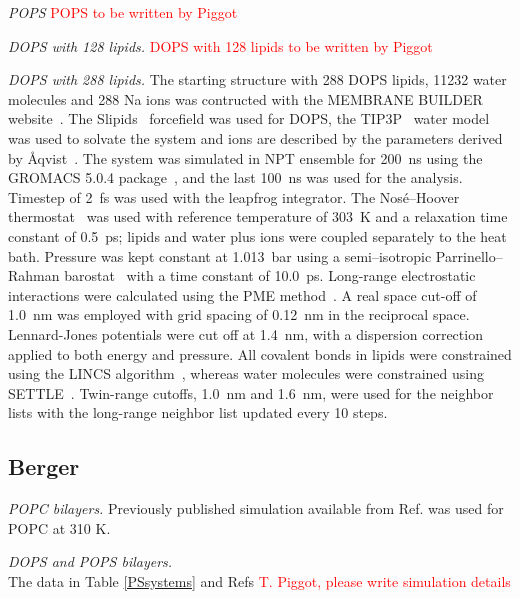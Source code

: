 \documentclass[journal=jpcbfk]{achemso}
\newcommand{\todo}[1]{\textcolor{red}{#1}}
\begin{document}
\noindent
{\it POPS}
\todo{POPS \cite{slipidsPOPS298K} to be written by Piggot}

\noindent
{\it DOPS with 128 lipids.}
\todo{DOPS with 128 lipids \cite{slipidsDOPS303K} to be written by Piggot}

\noindent
{\it DOPS with 288 lipids.}
The starting structure with 288 DOPS lipids, 11232 water molecules and 288 Na ions
was contructed with the MEMBRANE BUILDER website~\cite{ghahremanpour13}.
The Slipids~\cite{jambeck12,jambeck2012another} forcefield was used for DOPS, the TIP3P~\cite{jorgensen83} water model was used to solvate the system and
ions are described by the parameters derived by \AA{}qvist~\cite{aqvist90}.
The system was simulated in NPT ensemble for 200~ns using the GROMACS 5.0.4 package~\cite{abraham2015gromacs},
and the last 100~ns was used for the analysis.
Timestep of 2~fs was used with the leapfrog integrator. The Nos\'{e}--Hoover thermostat~\cite{nose84,hoover85} was used with reference temperature of 303~K and a relaxation time constant of 0.5~ps; lipids and water plus ions were coupled separately to the heat bath. Pressure was kept constant at 1.013~bar using a semi--isotropic Parrinello--Rahman
barostat~\cite{parrinello81} with a time constant of 10.0~ps. Long-range electrostatic interactions were calculated using the PME method~\cite{darden93,essman95}. A real space cut-off of 1.0~nm was employed with grid spacing of 0.12~nm in the reciprocal space. Lennard-Jones potentials were cut off at 1.4~nm, with a dispersion correction applied to both energy and pressure. All covalent bonds in lipids were constrained using the LINCS algorithm~\cite{hess97}, whereas water molecules were constrained using SETTLE~\cite{miyamoto92}. Twin-range cutoffs, 1.0~nm and 1.6~nm, were used for the neighbor lists with the long-range neighbor list updated every 10 steps.


\subsection{Berger}
\noindent
{\it POPC bilayers.} 
Previously published simulation \cite{ollila07a} available from Ref. 
was used for POPC at 310 K.

\noindent
{\it DOPS and POPS bilayers.} \\
The data in Table \ref{PSsystems} and Refs 
\todo{T. Piggot, please write simulation details} \\
\end{document}
